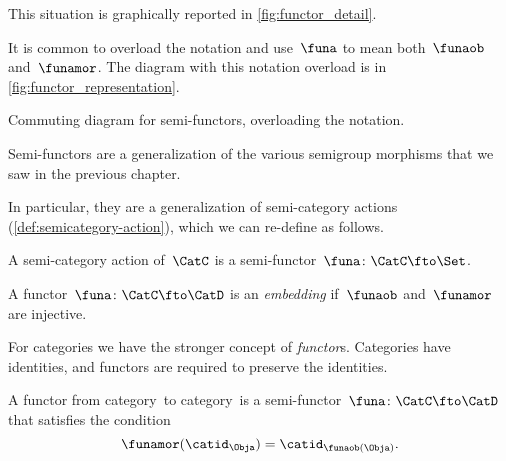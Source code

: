 This situation is graphically reported in \cref{fig:functor_detail}.

It is common to overload the notation and use~$\funa$ to mean both~$\funaob$ and~$\funamor$.
The diagram with this notation overload is in \cref{fig:functor_representation}.

\begin{marginfigure}
    \centering
    \caption{Commuting diagram for semi-functors, overloading the notation.}
    \label{fig:functor_representation}
\end{marginfigure}


Semi-functors are a generalization of the various semigroup morphisms that we saw in the previous chapter.



In particular, they are a generalization of semi-category actions (\cref{def:semicategory-action}), which we can re-define as follows.

\begin{ctdefinition}
    A semi-category action of~$\CatC$ is a semi-functor~$\funa\colon \CatC \fto \Set$.
\end{ctdefinition}


\begin{ctdefinition}
    \label{def:embedding-functor}
    A functor~$\funa\colon \CatC \fto \CatD$ is an \emph{embedding} if~$\funaob$ and~$\funamor$ are injective.
\end{ctdefinition}

For categories we have the stronger concept of \emph{functor}s.
Categories have identities, and functors are required to preserve the identities.


\begin{ctdefinition}
    \label{def:functor}
    A functor from category~\CatC to category~\CatD is a semi-functor~$\funa\colon \CatC \fto \CatD$
    that satisfies the condition
    \begin{equation}
        \label{eq:functor-condition}
        \funamor(\catid_\Obja)=\catid_{\funaob(\Obja)}.
    \end{equation}
\end{ctdefinition}

